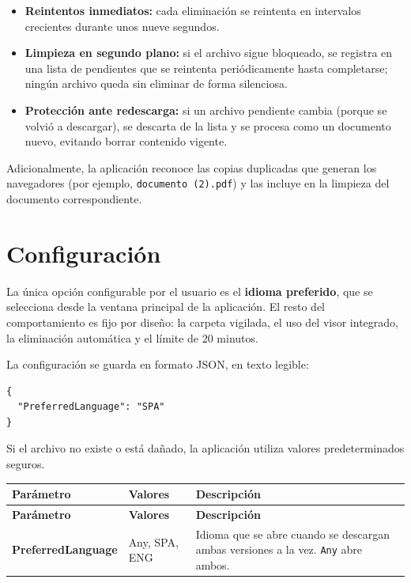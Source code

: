 \documentclass[11pt,a4paper]{article}
\begin{document}
\begin{itemize}[leftmargin=1.4em,itemsep=2pt]
  \item \textbf{Reintentos inmediatos:} cada eliminación se reintenta en
        intervalos crecientes durante unos nueve segundos.
  \item \textbf{Limpieza en segundo plano:} si el archivo sigue bloqueado, se
        registra en una lista de pendientes que se reintenta periódicamente hasta
        completarse; ningún archivo queda sin eliminar de forma silenciosa.
  \item \textbf{Protección ante redescarga:} si un archivo pendiente cambia
        (porque se volvió a descargar), se descarta de la lista y se procesa como
        un documento nuevo, evitando borrar contenido vigente.
\end{itemize}

Adicionalmente, la aplicación reconoce las copias duplicadas que generan los
navegadores (por ejemplo, \texttt{documento (2).pdf}) y las incluye en la
limpieza del documento correspondiente.

\section{Configuración}
La única opción configurable por el usuario es el \textbf{idioma preferido}, que
se selecciona desde la ventana principal de la aplicación. El resto del
comportamiento es fijo por diseño: la carpeta vigilada, el uso del visor
integrado, la eliminación automática y el límite de 20 minutos.

La configuración se guarda en formato JSON, en texto legible:

\begin{lstlisting}[caption={Ejemplo de settings.json.}]
{
  "PreferredLanguage": "SPA"
}
\end{lstlisting}

Si el archivo no existe o está dañado, la aplicación utiliza valores
predeterminados seguros.

\begin{xltabular}{\textwidth}{@{} >{\bfseries}p{3.4cm} p{2.2cm} L @{}}
\toprule
\normalfont\textbf{Parámetro} & \textbf{Valores} & \textbf{Descripción} \\
\midrule
\endfirsthead
\toprule
\normalfont\textbf{Parámetro} & \textbf{Valores} & \textbf{Descripción} \\
\midrule
\endhead
\bottomrule
\endfoot
PreferredLanguage & Any, SPA, ENG & Idioma que se abre cuando se descargan ambas versiones a la vez. \texttt{Any} abre ambos. \\
\bottomrule
\end{xltabular}
\end{document}
